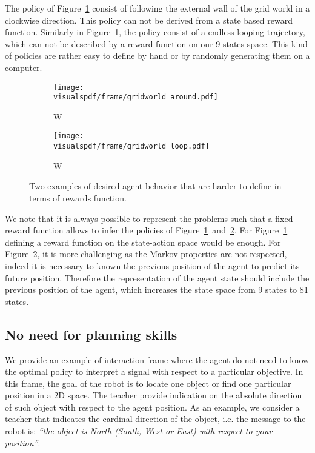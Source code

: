 The policy of Figure~\ref{fig:gridwolrdgenericframesaround} consist of following the external wall of the grid world in a clockwise direction. This policy can not be derived from a state based reward function. Similarly in Figure~\ref{fig:gridwolrdgenericframesaround}, the policy consist of a endless looping trajectory, which can not be described by a reward function on our 9 states space. This kind of policies are rather easy to define by hand or by randomly generating them on a computer. 

\begin{figure}[!htbp]
\centering
    \begin{subfigure}[b]{0.49\columnwidth}
        \centering
        \texttt{[image: \\visualspdf/frame/gridworld\_around.pdf]}
        \caption{W}
        \label{fig:gridwolrdgenericframesaround}
    \end{subfigure}
    \begin{subfigure}[b]{0.49\columnwidth}
        \centering
        \texttt{[image: \\visualspdf/frame/gridworld\_loop.pdf]}
        \caption{W}
        \label{fig:gridwolrdgenericframesloop}
    \end{subfigure}
\caption{Two examples of desired agent behavior that are harder to define in terms of rewards function.}
\label{fig:gridwolrdgenericframes}
\end{figure}

We note that it is always possible to represent the problems such that a fixed reward function allows to infer the policies of Figure~\ref{fig:gridwolrdgenericframesaround}~and~\ref{fig:gridwolrdgenericframesloop}. For Figure~\ref{fig:gridwolrdgenericframesaround} defining a reward function on the state-action space would be enough. For Figure~\ref{fig:gridwolrdgenericframesloop}, it is more challenging as the Markov properties are not respected, indeed it is necessary to known the previous position of the agent to predict its future position. Therefore the representation of the agent state should include the previous position of the agent, which increases the state space from 9 states to 81 states.

\subsection{No need for planning skills}

We provide an example of interaction frame where the agent do not need to know the optimal policy to interpret a signal with respect to a particular objective. In this frame, the goal of the robot is to locate one object or find one particular position in a 2D space. The teacher provide indication on the absolute direction of such object with respect to the agent position. As an example, we consider a teacher that indicates the cardinal direction of the object, i.e. the message to the robot is: \emph{``the object is North (South, West or East) with respect to your position''}.


